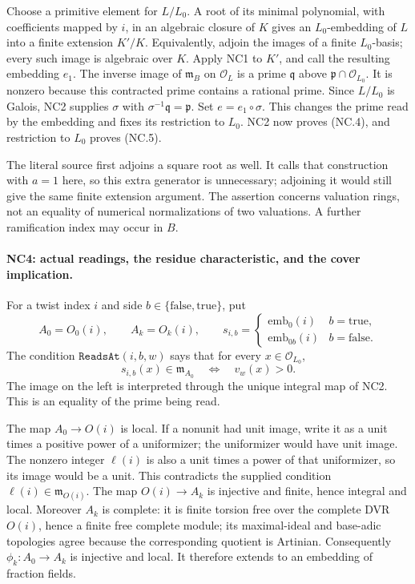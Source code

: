 Choose a primitive element for \(L/L_0\). A root of its minimal
polynomial, with coefficients mapped by \(i\), in an algebraic
closure of \(K\) gives an \(L_0\)-embedding of \(L\) into a
finite extension \(K'/K\). Equivalently, adjoin the images of
a finite \(L_0\)-basis; every such image is algebraic over \(K\).
Apply NC1 to \(K'\), and call the resulting embedding \(e_1\).
The inverse image of \(\mathfrak m_B\) on \(\mathcal O_L\)
is a prime \(\mathfrak q\) above
\(\mathfrak p\cap\mathcal O_{L_0}\). It is nonzero because this
contracted prime contains a rational prime. Since \(L/L_0\)
is Galois, NC2 supplies \(\sigma\) with
\(\sigma^{-1}\mathfrak q=\mathfrak p\).
Set \(e=e_1\circ\sigma\). This changes the prime read by the
embedding and fixes its restriction to \(L_0\).
NC2 now proves (NC.4), and restriction to \(L_0\) proves (NC.5).

The literal source first adjoins a square root as well. It calls
that construction with \(a=1\) here, so this extra generator is
unnecessary; adjoining it would still give the same finite
extension argument. The assertion concerns valuation rings,
not an equality of numerical normalizations of two valuations.
A further ramification index may occur in \(B\).

\paragraph{NC4: actual readings, the residue characteristic, and the cover implication.}
For a twist index \(i\) and side \(b\in\{\mathrm{false},\mathrm{true}\}\),
put
\[
 A_0=O_0(i),\qquad A_k=O_k(i),\qquad
 s_{i,b}=\begin{cases}\mathrm{emb}_0(i)&b=\mathrm{true},\\
                       \mathrm{emb}_{0b}(i)&b=\mathrm{false}.
          \end{cases}
\]
The condition \(\texttt{ReadsAt}(i,b,w)\) says that for every
\(x\in\mathcal O_{L_0}\),
\[
 s_{i,b}(x)\in\mathfrak m_{A_0}
       \quad\Longleftrightarrow\quad v_w(x)>0.
 \tag{NC.6}
\]
The image on the left is interpreted through the unique integral
map of NC2. This is an equality of the prime being read.

The map \(A_0\to O(i)\) is local. If a nonunit had unit image,
write it as a unit times a positive power of a uniformizer;
the uniformizer would have unit image. The nonzero integer
\(\ell(i)\) is also a unit times a power of that uniformizer,
so its image would be a unit. This contradicts the supplied
condition \(\ell(i)\in\mathfrak m_{O(i)}\).
The map \(O(i)\to A_k\) is injective and finite, hence integral
and local. Moreover \(A_k\) is complete: it is finite torsion
free over the complete DVR \(O(i)\), hence a finite free
complete module; its maximal-ideal and base-adic topologies
agree because the corresponding quotient is Artinian.
Consequently
\(\phi_k:A_0\to A_k\) is injective and local.
It therefore extends to an embedding of fraction fields.


